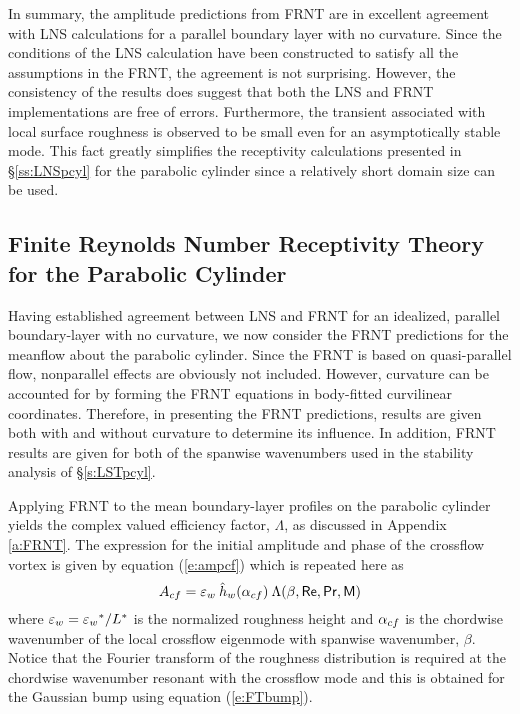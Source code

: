 In summary, the amplitude predictions from FRNT are in excellent agreement
with LNS calculations for a parallel boundary layer with no curvature.  Since
the conditions of the LNS calculation have been constructed to satisfy all the
assumptions in the FRNT, the agreement is not surprising.  However, the
consistency of the results does suggest that both the LNS and FRNT
implementations are free of errors.  Furthermore, the transient associated
with local surface roughness is observed to be small even for an
asymptotically stable mode.  This fact greatly simplifies the receptivity
calculations presented in \S\ref{ss:LNSpcyl} for the parabolic cylinder since
a relatively short domain size can be used.


\subsection[Finite Reynolds Number Receptivity Theory]{Finite Reynolds Number Receptivity Theory for the Parabolic Cylinder\label{ss:FRNTpcyl}}

Having established agreement between LNS and FRNT for an idealized, parallel
boundary-layer with no curvature, we now consider the FRNT predictions for the
meanflow about the parabolic cylinder.  Since the FRNT is based on
quasi-parallel flow, nonparallel effects are obviously not included.  However,
curvature can be accounted for by forming the FRNT equations in body-fitted
curvilinear coordinates.  Therefore, in presenting the FRNT predictions,
results are given both with and without curvature to determine its influence.
In addition, FRNT results are given for both of the spanwise wavenumbers used
in the stability analysis of \S\ref{s:LSTpcyl}.

Applying FRNT to the mean boundary-layer profiles on the parabolic cylinder
yields the complex valued efficiency factor, $\Lambda$, as discussed in
Appendix \ref{a:FRNT}.  The expression for the initial amplitude and phase of
the crossflow vortex is given by equation (\ref{e:ampcf}) which is repeated
here as
%
\begin{equation} \label{e:ampCF}
  A_{cf} = {\varepsilon_w} \: \hat h_w({\alpha_{cf}}) \: \Lambda(\beta,{\sf Re},{\sf Pr},{\sf M})
\end{equation}
%
where ${\varepsilon_w} = {\varepsilon_w}^* / L^*$ is the normalized roughness height and ${\alpha_{cf}}$ is the
chordwise wavenumber of the local crossflow eigenmode with spanwise
wavenumber, $\beta$.  Notice that the Fourier transform of the roughness
distribution is required at the chordwise wavenumber resonant with the
crossflow mode and this is obtained for the Gaussian bump using equation
(\ref{e:FTbump}).

